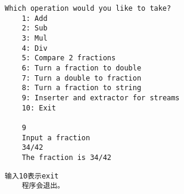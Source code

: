 \documentclass{ctexart} %
\begin{document}
\begin{lstlisting}[caption = 测试Inserter and extractor for streams]
    Which operation would you like to take?
    1: Add
    2: Sub
    3: Mul
    4: Div
    5: Compare 2 fractions
    6: Turn a fraction to double
    7: Turn a double to fraction
    8: Turn a fraction to string
    9: Inserter and extractor for streams
    10: Exit

    9
    Input a fraction
    34/42
    The fraction is 34/42
\end{lstlisting}
\vspace{10pt}

\begin{lstlisting}[caption = 测试Exit]
    输入10表示exit
    程序会退出。
\end{lstlisting}
\vspace{10pt}
\end{document}
